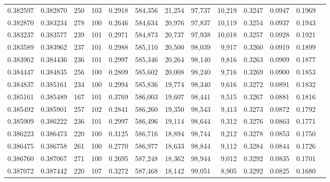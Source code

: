 \begin{tabular}{rrrrrrrrrrrrr}
0.382597 & 0.382870 &   250 & 103 &                                     0.2918 & 584,356 &  21,254 &  97,737 &  10,219 & 0.3247 & 0.0947 & 0.1969 \\
0.382870 & 0.383234 &   278 & 100 &                                     0.2646 & 584,634 &  20,976 &  97,837 &  10,119 & 0.3254 & 0.0937 & 0.1943 \\
0.383237 & 0.383577 &   239 & 101 &                                     0.2971 & 584,873 &  20,737 &  97,938 &  10,018 & 0.3257 & 0.0928 & 0.1921 \\
0.383589 & 0.383962 &   237 & 101 &                                     0.2988 & 585,110 &  20,500 &  98,039 &   9,917 & 0.3260 & 0.0919 & 0.1899 \\
0.383962 & 0.384436 &   236 & 101 &                                     0.2997 & 585,346 &  20,264 &  98,140 &   9,816 & 0.3263 & 0.0909 & 0.1877 \\
0.384447 & 0.384835 &   256 & 100 &                                     0.2809 & 585,602 &  20,008 &  98,240 &   9,716 & 0.3269 & 0.0900 & 0.1853 \\
0.384837 & 0.385161 &   234 & 100 &                                     0.2994 & 585,836 &  19,774 &  98,340 &   9,616 & 0.3272 & 0.0891 & 0.1832 \\
0.385161 & 0.385489 &   167 & 101 &                                     0.3769 & 586,003 &  19,607 &  98,441 &   9,515 & 0.3267 & 0.0881 & 0.1816 \\
0.385492 & 0.385901 &   257 & 102 &                                     0.2841 & 586,260 &  19,350 &  98,543 &   9,413 & 0.3273 & 0.0872 & 0.1792 \\
0.385909 & 0.386222 &   236 & 101 &                                     0.2997 & 586,496 &  19,114 &  98,644 &   9,312 & 0.3276 & 0.0863 & 0.1771 \\
0.386223 & 0.386473 &   220 & 100 &                                     0.3125 & 586,716 &  18,894 &  98,744 &   9,212 & 0.3278 & 0.0853 & 0.1750 \\
0.386475 & 0.386758 &   261 & 100 &                                     0.2770 & 586,977 &  18,633 &  98,844 &   9,112 & 0.3284 & 0.0844 & 0.1726 \\
0.386760 & 0.387067 &   271 & 100 &                                     0.2695 & 587,248 &  18,362 &  98,944 &   9,012 & 0.3292 & 0.0835 & 0.1701 \\
0.387072 & 0.387442 &   220 & 107 &                                     0.3272 & 587,468 &  18,142 &  99,051 &   8,905 & 0.3292 & 0.0825 & 0.1680 \\

\end{tabular}
